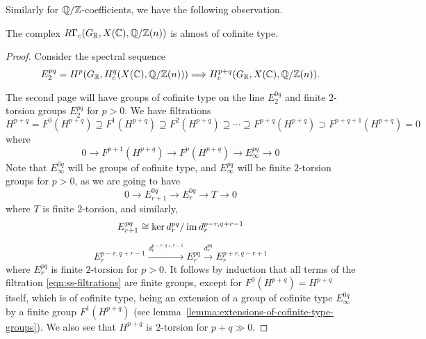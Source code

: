 \documentclass{article}
\numberwithin{equation}{section}
\begin{document}
Similarly for $\mathbb{Q}/\mathbb{Z}$-coefficients, we have the following observation.

\begin{lemma}
  \label{lemma:RGammac(GR,X(C),Q/Z(n))-almost-cofinite-type}
  The complex $R\Gamma_c (G_{\mathbb{R}}, X (\mathbb{C}), \mathbb{Q}/\mathbb{Z} (n))$
  is almost of cofinite type.

  \begin{proof}
    Consider the spectral sequence
    \[ E_2^{pq} = H^p (G_{\mathbb{R}}, H^q_c (X (\mathbb{C}), \mathbb{Q}/\mathbb{Z} (n)))
    \Longrightarrow
    H^{p+q}_c (G_{\mathbb{R}}, X (\mathbb{C}), \mathbb{Q}/\mathbb{Z} (n)). \]

    The second page will have groups of cofinite type on the line $E_2^{0q}$ and
    finite $2$-torsion groups $E_2^{pq}$ for $p > 0$. We have filtrations
    \begin{equation}
      \label{eqn:ss-filtrations}
      H^{p+q} = F^0 (H^{p+q}) \supseteq
      F^1 (H^{p+q}) \supseteq
      F^2 (H^{p+q}) \supseteq \cdots \supseteq
      F^{p+q} (H^{p+q}) \supset F^{p+q+1} (H^{p+q}) = 0
    \end{equation}
    where
    $$0 \to F^{p+1} (H^{p+q}) \to F^p (H^{p+q}) \to E_\infty^{pq} \to 0$$
    Note that $E^{0q}_\infty$ will be groups of cofinite type, and
    $E^{pq}_\infty$ will be finite $2$-torsion groups for $p > 0$, as we are
    going to have
    $$0 \to E_{r+1}^{0q} \to E_r^{0q} \to T \to 0$$
    where $T$ is finite $2$-torsion, and similarly,
    $$E_{r+1}^{pq} \cong \ker d_r^{pq} / \operatorname{im} d_r^{p-r,q+r-1}$$

    \[ E_r^{p-r,q+r-1} \xrightarrow{d_r^{p-r,q+r-1}}
    E_r^{pq} \xrightarrow{d_r^{pq}} E_r^{p+r,q-r+1} \]
    where $E_r^{pq}$ is finite $2$-torsion for $p > 0$. It follows by induction
    that all terms of the filtration \eqref{eqn:ss-filtrations} are finite
    groups, except for $F^0 (H^{p+q}) = H^{p+q}$ itself, which is of cofinite
    type, being an extension of a group of cofinite type $E_\infty^{0q}$ by a
    finite group $F^1 (H^{p+q})$
    (see lemma~\ref{lemma:extensions-of-cofinite-type-groups}). We also see that
    $H^{p+q}$ is $2$-torsion for $p+q \gg 0$.
  \end{proof}
\end{lemma}
\end{document}
